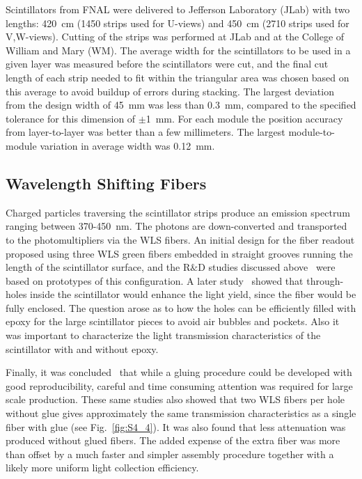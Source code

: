 Scintillators from FNAL were delivered to Jefferson Laboratory (JLab) with two lengths: 420~cm (1450 strips
used for U-views) and 450~cm (2710 strips used for V,W-views). Cutting of the strips was performed at JLab
and at the College of William and Mary (WM). The average width for the scintillators to be used in a given layer
was measured before the scintillators were cut, and the final cut length of each strip needed to fit within the
triangular area was chosen based on this average to avoid buildup of errors during stacking. The largest deviation
from the design width of 45~mm was less than 0.3~mm, compared to the specified tolerance for this dimension
of $\pm$1~mm.  For each module the position accuracy from layer-to-layer was better than a few millimeters.  The
largest module-to-module variation in average width was 0.12~mm.

\subsection{Wavelength Shifting Fibers}

Charged particles traversing the scintillator strips produce an emission spectrum ranging between 370-450~nm.
The photons are down-converted and transported to the photomultipliers via the WLS fibers. An initial design
for the fiber readout proposed using three WLS green fibers embedded in straight grooves running the length
of the scintillator surface, and the R$\&$D studies discussed above~\cite{2007007} were based on prototypes of
this configuration. A later study~\cite{2009018} showed that through-holes inside the scintillator would enhance
the light yield, since the fiber would be fully enclosed. The question arose as to how the holes can be efficiently
filled with epoxy for the large scintillator pieces to avoid air bubbles and pockets. Also it was important to
characterize the light transmission characteristics of the scintillator with and without epoxy.

Finally, it was concluded~\cite{2010012} that while a gluing procedure could be developed with good
reproducibility, careful and time consuming attention was required for large scale production. These same studies
also showed that two WLS fibers per hole without glue gives approximately the same transmission characteristics
as a single fiber with glue (see Fig.~\ref{fig:S4_4}). It was also found that less attenuation was produced without
glued fibers. The added expense of the extra fiber was more than offset by a much faster and simpler assembly
procedure together with a likely more uniform light collection efficiency. 

